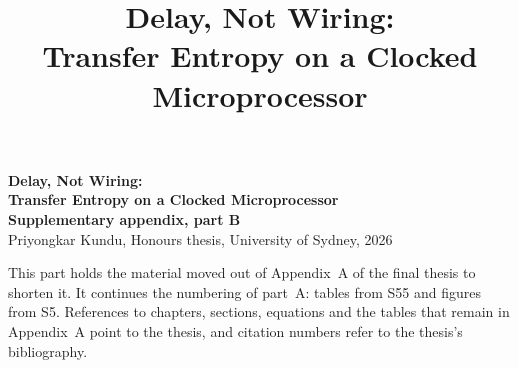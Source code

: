 \documentclass{usydthesis}
\title{{\bf\Huge Delay, Not Wiring:\\[0.3em] \LARGE Transfer Entropy on a Clocked Microprocessor}}
\author{\memyself}
\begin{document}
\begin{center}{\Large\bfseries Delay, Not Wiring:\\ Transfer Entropy on a Clocked Microprocessor\\[4pt] Supplementary appendix, part B}\\[8pt]
Priyongkar Kundu, Honours thesis, University of Sydney, 2026\end{center}
\noindent This part holds the material moved out of Appendix~A of the final thesis to shorten it. It continues the numbering of part~A: tables from S55 and figures from S5. References to chapters, sections, equations and the tables that remain in Appendix~A point to the thesis, and citation numbers refer to the thesis's bibliography.
\renewcommand{\thechapter}{S}\setcounter{chapter}{1}
\renewcommand{\thesection}{S.\arabic{section}}\setcounter{section}{13}
\renewcommand{\thetable}{S\arabic{table}}\setcounter{table}{54}
\renewcommand{\thefigure}{S\arabic{figure}}\setcounter{figure}{4}
\renewcommand{\theequation}{B\arabic{equation}}

\end{document}
